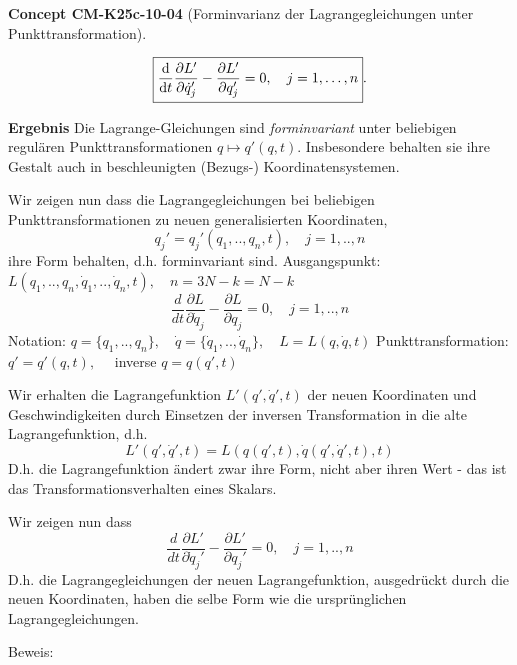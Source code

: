 \documentclass[10pt, letterpaper]{article}
\newcommand{\CustomHeading}[3]{%
  \par\medskip\noindent%
  \textbf{#1 #2} \textnormal{(#3)}.\enskip%
}
\newenvironment{CONC}[2]{\begin{unitbox}\CustomHeading{Concept}{#1}{#2}}{\end{unitbox}}
\begin{document}
\begin{CONC}{CM-K25c-10-04}{Forminvarianz der Lagrangegleichungen unter Punkttransformation}
\[
  \boxed{%
    \frac{\mathrm d}{\mathrm dt}
      \frac{\partial L'}{\partial\dot q'_j}
    -\frac{\partial L'}{\partial q'_j}=0,
    \quad j=1,\dots,n }.
\]

\textbf{Ergebnis}
Die Lagrange-Gleichungen sind \emph{forminvariant} unter beliebigen
regulären Punkttransformationen
\( q\mapsto q'(q,t) \).
Insbesondere behalten sie ihre Gestalt auch in beschleunigten
(Bezugs-) Koordinatensystemen.
\end{CONC}







Wir zeigen nun dass die Lagrangegleichungen bei beliebigen Punkttransformationen zu neuen generalisierten Koordinaten,
$$q_j' = q_j'(q_1,..,q_n,t), \quad j=1,..,n$$
ihre Form behalten, d.h. forminvariant sind.
Ausgangspunkt: $L(q_1,..,q_n,\dot{q}_1,..,\dot{q}_n,t), \quad n=3N-k=N-k$
$$\dfrac{d}{dt}\dfrac{\partial L}{\partial \dot{q}_j} - \dfrac{\partial L}{\partial q_j} = 0, \quad j=1,..,n$$
Notation: $q=\{q_1,..,q_n\}, \quad \dot{q}=\{\dot{q}_1,..,\dot{q}_n\}, \quad L=L(q,\dot{q},t)$
Punkttransformation: $q'=q'(q,t), \quad$ inverse $q=q(q',t)$

Wir erhalten die Lagrangefunktion $L'(q',\dot{q}',t)$ der neuen Koordinaten und Geschwindigkeiten durch Einsetzen der inversen Transformation in die alte Lagrangefunktion, d.h.
$$L'(q',\dot{q}',t) = L(q(q',t),\dot{q}(q',\dot{q}',t),t)$$
D.h. die Lagrangefunktion ändert zwar ihre Form, nicht aber ihren Wert - das ist das Transformationsverhalten eines Skalars.

Wir zeigen nun dass
$$\dfrac{d}{dt}\dfrac{\partial L'}{\partial \dot{q}_j'} - \dfrac{\partial L'}{\partial q_j'} = 0, \quad j=1,..,n$$
D.h. die Lagrangegleichungen der neuen Lagrangefunktion, ausgedrückt durch die neuen Koordinaten, haben die selbe Form wie die ursprünglichen Lagrangegleichungen.

Beweis:
\end{document}
